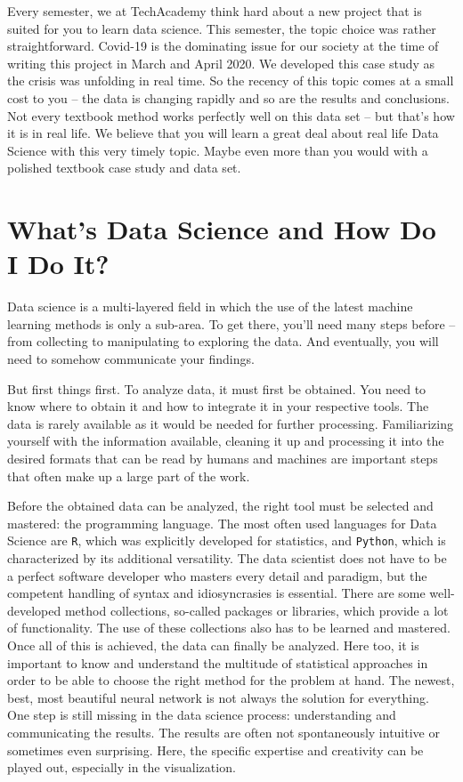 \documentclass[
  11pt,
]{article}
\begin{document}
Every semester, we at TechAcademy think hard about a new project that is suited for you to learn data science. This semester, the topic choice was rather straightforward. Covid-19 is the dominating issue for our society at the time of writing this project in March and April 2020. We developed this case study as the crisis was unfolding in real time. So the recency of this topic comes at a small cost to you -- the data is changing rapidly and so are the results and conclusions. Not every textbook method works perfectly well on this data set -- but that's how it is in real life. We believe that you will learn a great deal about real life Data Science with this very timely topic. Maybe even more than you would with a polished textbook case study and data set.

\hypertarget{whats-data-science-and-how-do-i-do-it}{%
\section{What's Data Science and How Do I Do It?}\label{whats-data-science-and-how-do-i-do-it}}

Data science is a multi-layered field in which the use of the latest machine learning methods is only a sub-area. To get there, you'll need many steps before -- from collecting to manipulating to exploring the data. And eventually, you will need to somehow communicate your findings.

But first things first. To analyze data, it must first be obtained. You need to know where to obtain it and how to integrate it in your respective tools. The data is rarely available as it would be needed for further processing. Familiarizing yourself with the information available, cleaning it up and processing it into the desired formats that can be read by humans and machines are important steps that often make up a large part of the work.

Before the obtained data can be analyzed, the right tool must be selected and mastered: the programming language. The most often used languages for Data Science are \texttt{R}, which was explicitly developed for statistics, and \texttt{Python}, which is characterized by its additional versatility. The data scientist does not have to be a perfect software developer who masters every detail and paradigm, but the competent handling of syntax and idiosyncrasies is essential.
There are some well-developed method collections, so-called packages or libraries, which provide a lot of functionality. The use of these collections also has to be learned and mastered.
Once all of this is achieved, the data can finally be analyzed. Here too, it is important to know and understand the multitude of statistical approaches in order to be able to choose the right method for the problem at hand. The newest, best, most beautiful neural network is not always the solution for everything.\\
One step is still missing in the data science process: understanding and communicating the results. The results are often not spontaneously intuitive or sometimes even surprising. Here, the specific expertise and creativity can be played out, especially in the visualization.
\end{document}
